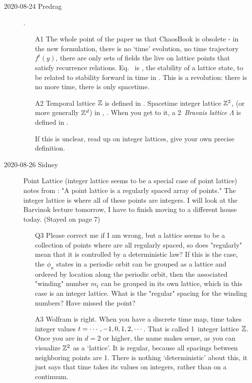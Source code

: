 \begin{description}
\item[2020-08-24 Predrag].

\begin{itemize}
  \item[A1]
The whole point of the paper us that ChaosBook is obsolete - in the new
formulation, there is no `time' evolution, no time trajectory $f^t(y)$,
there are only sets of fields the live on lattice points that satisfy
recurrence relations. Eq.~ is \emph{\jacobianOrb}, the
stability of a lattice state, to be related to stability forward in time
in . This is a revolution: there is no more time, there
is only spacetime.
  \item[A2]
Temporal lattice $\mathbb{Z}$ is defined in . Spacetime
integer lattice $\mathbb{Z}^2$, (or more generally $\mathbb{Z}^d$) in
, .
When you get to it, a 2\dmn\ \emph{Bravais lattice} $\Lambda$ is defined
in .

If this is unclear, read up on integer lattices, give your own precise definition.
\end{itemize}

\item[2020-08-26 Sidney]
Point Lattice (integer lattice seems to be a special case of point lattice) notes from : "A point lattice is a regularly spaced array of points." The integer lattice is where all of these points are integers. I will look at the Barvinok lecture tomorrow, I have to finish moving to a different house today. (Stayed on page 7)

\begin{itemize}
	\item[Q3]
Please correct me if I am wrong, but a lattice seems to be a collection of points where are all regularly spaced, so does "regularly" mean that it is controlled by a deterministic law? If this is the case, the $\phi_n$ states in a periodic orbit can be grouped as a lattice and ordered by location along the periodic orbit, then the associated "winding" number $m_t$ can be grouped in its own lattice, which in this case is an integer lattice. What is the "regular" spacing for the winding numbers? Have missed the point?
\end{itemize}

\begin{itemize}
  \item[A3]
Wolfram is right. When you have a discrete time map, time takes integer
values $t=\cdots,-1,0,1,2,\cdots$. That is called 1\dmn\ integer lattice
$\mathbb{Z}$. Once you are in $d=2$ or higher, the name makes sense, as
you can visualize $\mathbb{Z}^2$ as a `lattice'. It is regular, because all spacings
between neighboring points are 1. There is nothing `deterministic' about
this, it just says that time takes its values on integers, rather than on a continuum.


\end{itemize}
\end{description}
